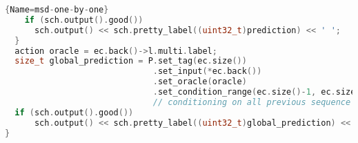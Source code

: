 \begin{appendix}
\begin{lstlisting}[language=C++,
                   basicstyle=\tiny\ttfamily]{Name=msd-one-by-one}
    if (sch.output().good())
      sch.output() << sch.pretty_label((uint32_t)prediction) << ' ';
  }
  action oracle = ec.back()->l.multi.label;
  size_t global_prediction = P.set_tag(ec.size())
                              .set_input(*ec.back())
                              .set_oracle(oracle)
                              .set_condition_range(ec.size()-1, ec.size()-1, 'a').predict();
                              // conditioning on all previous sequence decisions
  if (sch.output().good())
      sch.output() << sch.pretty_label((uint32_t)global_prediction) << ' ';
}
\end{lstlisting}
\end{appendix}
